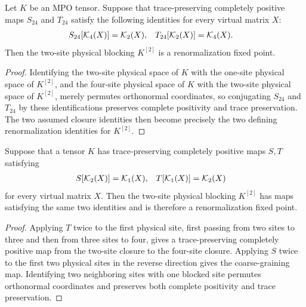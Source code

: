 \begin{lemma}
    \label{thm:mpdo_block_two_rfp_of_two_four_maps}
    \leanok
    Let $K$ be an MPO tensor. Suppose that trace-preserving completely positive
    maps $S_{24}$ and $T_{24}$ satisfy the following identities for every
    virtual matrix $X$:
    \begin{align}
        S_{24}[\mathcal K_4(X)] & =\mathcal K_2(X),        &
        T_{24}[\mathcal K_2(X)] & =\mathcal K_4(X). \notag
    \end{align}
    Then the two-site physical blocking $K^{[2]}$ is a renormalization fixed
    point.
\end{lemma}

\begin{proof}\leanok
    Identifying the two-site physical space of $K$ with the one-site physical
    space of $K^{[2]}$, and the four-site physical space of $K$ with
    the two-site physical space of $K^{[2]}$, merely
    permutes orthonormal coordinates, so conjugating $S_{24}$ and $T_{24}$ by
    these identifications preserves complete positivity and trace preservation. The two
    assumed closure identities then become precisely the two defining
    renormalization identities for $K^{[2]}$.
\end{proof}

\begin{lemma}
    \label{thm:mpdo_rfp_via_ts_block_two}
    \leanok
    Suppose that a tensor $K$ has trace-preserving completely positive maps
    $S,T$ satisfying
    \begin{align}
        S[\mathcal K_2(X)] & =\mathcal K_1(X),       &
        T[\mathcal K_1(X)] & =\mathcal K_2(X) \notag
    \end{align}
    for every virtual matrix $X$. Then the two-site physical blocking
    $K^{[2]}$ has maps satisfying the same two identities and is therefore a
    renormalization fixed point.
\end{lemma}

\begin{proof}
    \leanok
    Applying $T$ twice to the first physical site, first passing from two sites to
    three and then from three sites to four, gives a trace-preserving
    completely positive map from the two-site closure to the four-site closure.
    Applying $S$ twice to the first two physical sites in the reverse direction
    gives the coarse-graining map. Identifying two
    neighboring sites with one blocked site permutes orthonormal
    coordinates and preserves both complete positivity and trace preservation.
\end{proof}

